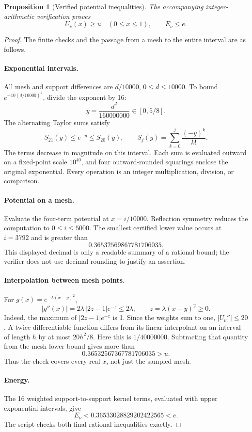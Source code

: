 \documentclass[11pt,letterpaper]{article}
\newtheorem{proposition}[theorem]{Proposition}
\theoremstyle{definition}
\begin{document}
\begin{proposition}[Verified potential inequalities]
\label{prop:verified-potential}
The accompanying integer-arithmetic verification proves
\[
 U_\nu(x)\ge u\quad(0\le x\le1),\qquad E_\nu\le e.
\]
\end{proposition}
\begin{proof}
The finite checks and the passage from a mesh to the entire interval
are as follows.

\paragraph{Exponential intervals.}
All mesh and support differences are \(d/10000\), \(0\le d\le10000\).
To bound \(e^{-10(d/10000)^2}\), divide the exponent by 16:
\[
 y=\frac{d^2}{160000000}\in[0,5/8].
\]
The alternating Taylor sums satisfy
\[
 S_{21}(y)\le e^{-y}\le S_{20}(y),\qquad
 S_j(y)=\sum_{k=0}^j\frac{(-y)^k}{k!}.
\]
The terms decrease in magnitude on this interval. Each sum is evaluated
outward on a fixed-point scale \(10^{40}\), and four outward-rounded
squarings enclose the original exponential. Every operation is an
integer multiplication, division, or comparison.

\paragraph{Potential on a mesh.}
Evaluate the four-term potential at \(x=i/10000\).
Reflection symmetry reduces the computation to \(0\le i\le5000\).
The smallest certified lower value occurs at \(i=3792\) and is greater
than
\[
 0.36532569867781706035.
\]
This displayed decimal is only a readable summary of a rational bound;
the verifier does not use decimal rounding to justify an assertion.

\paragraph{Interpolation between mesh points.}
For \(g(x)=e^{-\lambda(x-y)^2}\),
\[
 |g''(x)|=
 2\lambda\,|2z-1|e^{-z}\le2\lambda,\qquad
 z=\lambda(x-y)^2\ge0.
\]
Indeed, the maximum of \(|2z-1|e^{-z}\) is 1. Since the weights sum
to one, \(|U_\nu''|\le20\). A twice differentiable function differs
from its linear interpolant on an interval of length \(h\) by at most
\(20h^2/8\). Here this is \(1/40000000\).
Subtracting that quantity from the mesh lower bound gives more than
\[
 0.36532567367781706035>u.
\]
Thus the check covers every real \(x\), not just the sampled mesh.

\paragraph{Energy.}
The 16 weighted support-to-support kernel terms, evaluated with upper
exponential intervals, give
\[
 E_\nu<0.36533028829202422565<e.
\]
The script checks both final rational inequalities exactly.
\end{proof}
\end{document}
